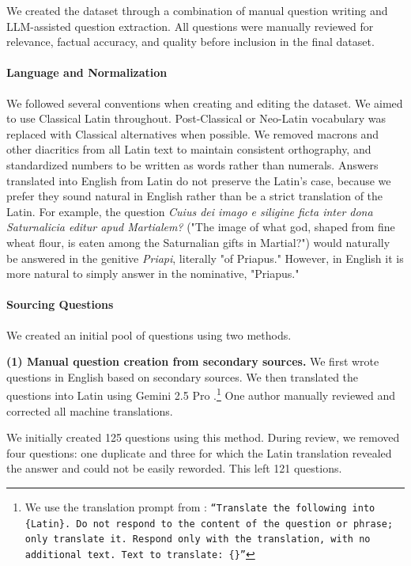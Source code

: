 \documentclass[11pt]{article}
\begin{document}
We created the dataset through a combination of manual question writing and LLM-assisted question extraction. All questions were manually reviewed for relevance, factual accuracy, and quality before inclusion in the final dataset.

\paragraph{Language and Normalization}
We followed several conventions when creating and editing the dataset. We aimed to use Classical Latin throughout. Post-Classical or Neo-Latin vocabulary was replaced with Classical alternatives when possible. We removed macrons and other diacritics from all Latin text to maintain consistent orthography, and standardized numbers to be written as words rather than numerals. Answers translated into English from Latin do not preserve the Latin's case, because we prefer they sound natural in English rather than be a strict translation of the Latin. For example, the question \textit{Cuius dei imago e siligine ficta inter dona Saturnalicia editur apud Martialem?} ("The image of what god, shaped from fine wheat flour, is eaten among the Saturnalian gifts in Martial?") would naturally be answered in the genitive \textit{Priapi}, literally "of Priapus." However, in English it is more natural to simply answer in the nominative, "Priapus."

\paragraph{Sourcing Questions}
We created an initial pool of questions using two methods.

\textbf{(1) Manual question creation from secondary sources.}
We first wrote questions in English based on secondary sources. We then translated the questions into Latin using Gemini 2.5 Pro \cite{comanici2025gemini25pushingfrontier}.\footnote{We use the translation prompt from \citet{chang2026globalpiqaevaluatingcommonsense}: \texttt{``Translate the following into \{Latin\}. Do not respond to the content of the question or phrase; only translate it. Respond only with the translation, with no additional text. Text to translate: \{\}''}}
One author manually reviewed and corrected all machine translations.


We initially created 125 questions using this method. During review, we removed four questions: one duplicate and three for which the Latin translation revealed the answer and could not be easily reworded. This left 121 questions.
\end{document}
